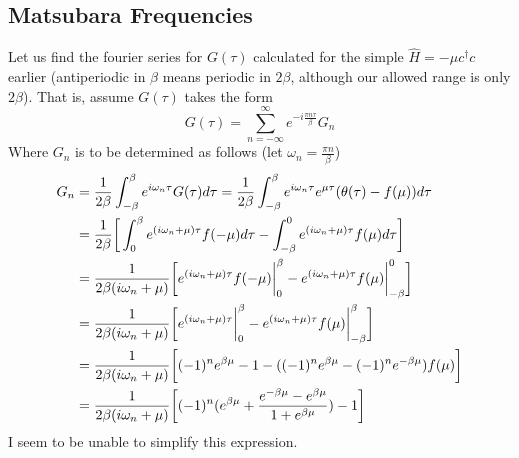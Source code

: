\documentclass{article}
\begin{document}
\subsection{Matsubara Frequencies}
Let us find the fourier series for $G(\tau)$ calculated for the simple $\hat{H} = -\mu c^\dagger c$ earlier (antiperiodic in $\beta$ means periodic in $2\beta$, although our allowed range is only $2\beta$). That is, assume $G(\tau)$ takes the form
\begin{equation*}
G(\tau) = \sum_{n=-\infty}^\infty e^{-i\frac{\pi n \tau}{\beta}} G_n
\end{equation*}
Where $G_n$ is to be determined as follows (let $\omega_n = \frac{\pi n}{\beta}$)
\begin{align*}
G_n &= \frac{1}{2\beta}\int_{-\beta}^\beta e^{i\omega_n \tau} G(\tau) d\tau = \frac{1}{2\beta} \int_{-\beta}^\beta e^{i\omega_n\tau} e^{\mu\tau}(\operatorname{\theta}(\tau) - f(\mu)) d\tau \\
&= \frac{1}{2\beta}\bigg[\int_{0}^\beta e^{(i\omega_n + \mu)\tau}f(-\mu)d\tau - \int_{-\beta}^0 e^{(i\omega_n + \mu)\tau}f(\mu)d\tau \bigg] \\
&= \frac{1}{2\beta(i\omega_n + \mu)}\bigg[e^{(i\omega_n + \mu)\tau}f(-\mu) \bigg|_0^\beta - e^{(i\omega_n+\mu)\tau}f(\mu)\bigg|_{-\beta}^0 \bigg] \\
&= \frac{1}{2\beta(i\omega_n + \mu)}\bigg[e^{(i\omega_n + \mu)\tau}\bigg|_0^\beta - e^{(i\omega_n + \mu)\tau}f(\mu)\bigg|_{-\beta}^\beta       \bigg] \\
&= \frac{1}{2\beta(i\omega_n + \mu)}\bigg[(-1)^n e^{\beta\mu} - 1 - ((-1)^ne^{\beta\mu} - (-1)^ne^{-\beta\mu})f(\mu)  \bigg]\\
&= \frac{1}{2\beta(i\omega_n +\mu)}\bigg[(-1)^n(e^{\beta\mu}+ \frac{e^{-\beta\mu} - e^{\beta\mu}}{1+e^{\beta\mu}} ) - 1 \bigg]
\end{align*}
I seem to be unable to simplify this expression.
\end{document}
